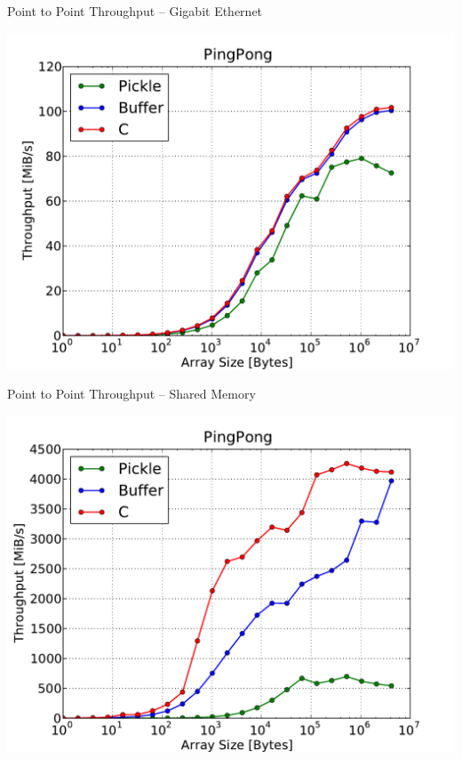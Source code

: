 \documentclass{beamer}
\begin{document}
\begin{frame}
  \begin{center}
    Point to Point Throughput -- Gigabit Ethernet
  \end{center}
  \includegraphics[scale=0.5]{PingPong_GE.pdf}
\end{frame}
\begin{frame}
  \begin{center}
    Point to Point Throughput -- Shared Memory
  \end{center}
  \includegraphics[scale=0.5]{PingPong_SM.pdf}
\end{frame}
\end{document}
